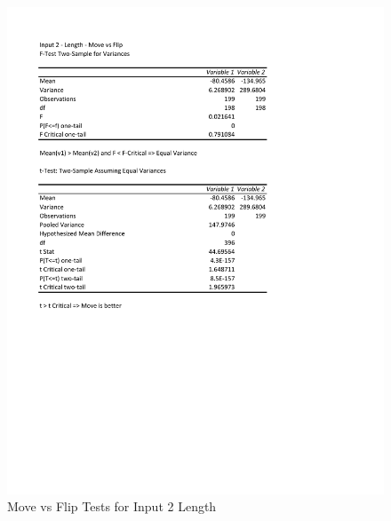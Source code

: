 \documentclass[times]{article}
\begin{document}
		\begin{figure}
		\caption{Move vs Flip Tests for Input 2 Length}
		\label{fig:2mutation}
		\includegraphics[width=\textwidth]{./t_test/2_mutation.pdf}
	\end{figure}
\end{document}
